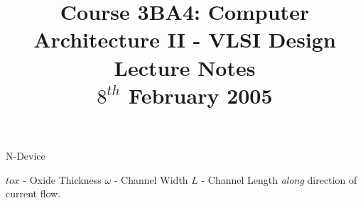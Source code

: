 \documentclass[a4paper,12pt]{article}
\begin{document}
\title{Course 3BA4: Computer Architecture II - VLSI Design \\ Lecture Notes \\ $8^{th}$ February 2005}

\maketitle

\begin{table}[hbtp]


\caption{N-Device}

\end{table}

$tox$ - Oxide Thickness
$\omega$ - Channel Width
$L$ - Channel Length \emph{along} direction of current flow.
\end{document}
